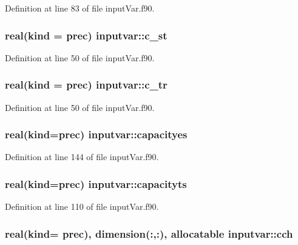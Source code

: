 Definition at line 83 of file input\-Var.\-f90.

\hypertarget{classinputvar_afe1c70c120d3938f07fa818f015ad52d}{
\subsubsection[{c\-\_\-st}]{\setlength{\rightskip}{0pt plus 5cm}real(kind = prec) inputvar\-::c\-\_\-st}}\label{classinputvar_afe1c70c120d3938f07fa818f015ad52d}


Definition at line 50 of file input\-Var.\-f90.

\hypertarget{classinputvar_a52f3b90c5f4c7bb282ebc24e762032a2}{
\subsubsection[{c\-\_\-tr}]{\setlength{\rightskip}{0pt plus 5cm}real(kind = prec) inputvar\-::c\-\_\-tr}}\label{classinputvar_a52f3b90c5f4c7bb282ebc24e762032a2}


Definition at line 50 of file input\-Var.\-f90.

\hypertarget{classinputvar_a4160798c67ffa5c237c6a3febf2eb38f}{
\subsubsection[{capacityes}]{\setlength{\rightskip}{0pt plus 5cm}real(kind=prec) inputvar\-::capacityes}}\label{classinputvar_a4160798c67ffa5c237c6a3febf2eb38f}


Definition at line 144 of file input\-Var.\-f90.

\hypertarget{classinputvar_aa1efd68463d126d8971abdafa06d3a33}{
\subsubsection[{capacityts}]{\setlength{\rightskip}{0pt plus 5cm}real(kind=prec) inputvar\-::capacityts}}\label{classinputvar_aa1efd68463d126d8971abdafa06d3a33}


Definition at line 110 of file input\-Var.\-f90.

\hypertarget{classinputvar_a88bb670dc0bca944104c292071818a36}{
\subsubsection[{cch}]{\setlength{\rightskip}{0pt plus 5cm}real(kind= prec), dimension(\-:,\-:), allocatable inputvar\-::cch}}\label{classinputvar_a88bb670dc0bca944104c292071818a36}


